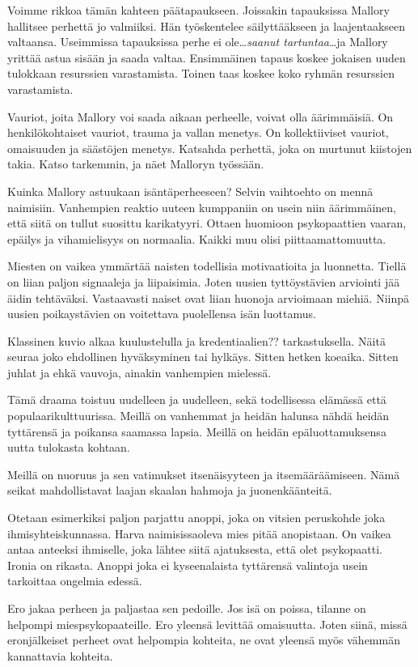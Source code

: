 Voimme rikkoa tämän kahteen päätapaukseen. Joissakin tapauksissa Mallory hallitsee perhettä jo valmiiksi. Hän työskentelee säilyttääkseen ja laajentaakseen valtaansa. Useimmissa tapauksissa perhe ei ole\ldots\emph{saanut tartuntaa}\ldots ja Mallory yrittää astua sisään ja saada valtaa. Ensimmäinen tapaus koskee jokaisen uuden tulokkaan resurssien varastamista. Toinen taas koskee koko ryhmän resurssien varastamista.

Vauriot, joita Mallory voi saada aikaan perheelle, voivat olla äärimmäisiä. On henkilökohtaiset vauriot, trauma ja vallan menetys. On kollektiiviset vauriot, omaisuuden ja säästöjen menetys. Katsahda perhettä, joka on murtunut kiistojen takia. Katso tarkemmin, ja näet Malloryn työssään.

Kuinka Mallory astuukaan isäntäperheeseen? Selvin vaihtoehto on mennä naimisiin. Vanhempien reaktio uuteen kumppaniin on usein niin äärimmäinen, että siitä on tullut suosittu karikatyyri. Ottaen huomioon psykopaattien vaaran, epäilys ja vihamielisyys on normaalia. Kaikki muu olisi piittaamattomuutta.

Miesten on vaikea ymmärtää naisten todellisia motivaatioita ja luonnetta. Tiellä on liian paljon signaaleja ja liipaisimia. Joten uusien tyttöystävien arviointi jää äidin tehtäväksi. Vastaavasti naiset ovat liian huonoja arvioimaan miehiä. Niinpä uusien poikaystävien on voitettava puolellensa isän luottamus.

Klassinen kuvio alkaa kuulustelulla ja kredentiaalien?? tarkastuksella. Näitä seuraa joko ehdollinen hyväksyminen tai hylkäys. Sitten hetken koeaika. Sitten juhlat ja ehkä vauvoja, ainakin vanhempien mielessä.

Tämä draama toistuu uudelleen ja uudelleen, sekä todellisessa elämässä että populaarikulttuurissa. Meillä on vanhemmat ja heidän halunsa nähdä heidän tyttärensä ja poikansa saamassa lapsia. Meillä on heidän epäluottamuksensa uutta tulokasta kohtaan.

Meillä on nuoruus ja sen vatimukset itsenäisyyteen ja itsemääräämiseen. Nämä seikat mahdollistavat laajan skaalan hahmoja ja juonenkäänteitä.

Otetaan esimerkiksi paljon parjattu anoppi, joka on vitsien peruskohde joka ihmisyhteiskunnassa. Harva naimisissaoleva mies pitää anopistaan. On vaikea antaa anteeksi ihmiselle, joka lähtee siitä ajatuksesta, että olet psykopaatti. Ironia on rikasta. Anoppi joka ei kyseenalaista tyttärensä valintoja usein tarkoittaa ongelmia edessä.

Ero jakaa perheen ja paljastaa sen pedoille. Jos isä on poissa, tilanne on helpompi miespsykopaateille. Ero yleensä levittää omaisuutta. Joten siinä, missä eronjälkeiset perheet ovat helpompia kohteita, ne ovat yleensä myös vähemmän kannattavia kohteita.

